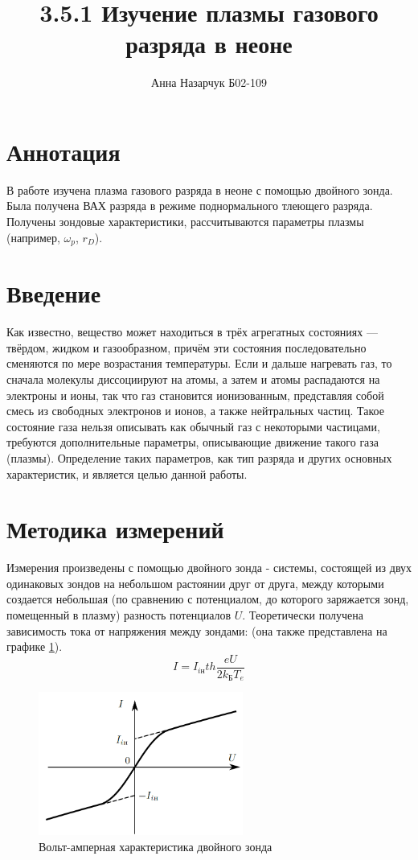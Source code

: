 \documentclass[a4paper,12pt]{article} %
\author{Анна Назарчук Б02-109}
\title{3.5.1 Изучение плазмы газового разряда в неоне}
\date{}
\begin{document}
\maketitle
\section{Аннотация}
В работе изучена плазма газового разряда в неоне с помощью двойного зонда. Была получена ВАХ разряда в режиме поднормального тлеющего разряда. Получены зондовые характеристики, рассчитываются параметры плазмы (например, $\omega_p$, $r_D$).


\section{Введение}
Как известно, вещество может находиться в трёх агрегатных состояниях
— твёрдом, жидком и газообразном, причём эти состояния последовательно
сменяются по мере возрастания температуры. Если и дальше
нагревать газ, то сначала молекулы диссоциируют на атомы, а затем и
атомы распадаются на электроны и ионы, так что газ становится ионизованным,
представляя собой смесь из свободных электронов и ионов,
а также нейтральных частиц. Такое состояние газа нельзя описывать как обычный газ с некоторыми частицами, требуются дополнительные параметры, описывающие движение такого газа (плазмы). Определение таких параметров, как тип разряда и других основных характеристик, и является целью данной работы.


\section{Методика измерений}

Измерения произведены с помощью двойного зонда - системы, состоящей из двух одинаковых зондов на небольшом растоянии друг от друга, между которыми создается небольшая (по сравнению с потенциалом, до которого заряжается зонд, помещенный в плазму) разность потенциалов $U$. Теоретически получена зависимость тока от напряжения между зондами: (она также представлена на графике \ref{двойной}).
\begin{equation}
I = I_{iн} th\frac{eU}{2k_БT_e}
\end{equation}
\begin{figure}[h!]
\begin{center}
\includegraphics[width=0.6\textwidth]{Двойной}
\caption{Вольт-амперная характеристика двойного зонда} \label{двойной}
\end{center}
\end{figure}
\end{document}
